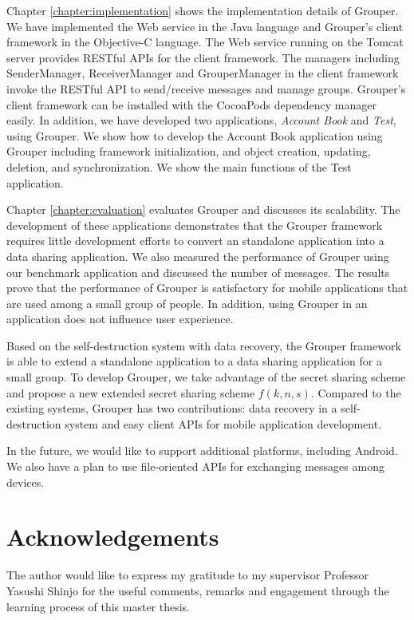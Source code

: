 \documentclass[a4paper,11pt]{report}
\begin{document}
Chapter \ref{chapter:implementation} shows the implementation details of Grouper.
We have implemented the Web service in the Java language and Grouper's client framework in the Objective-C language.
The Web service running on the Tomcat server provides RESTful APIs for the client framework. 
The managers including SenderManager, ReceiverManager and GrouperManager in the client framework invoke the RESTful API to send/receive messages and manage groups.
Grouper's client framework can be installed with the CocoaPods dependency manager easily.
In addition, we have developed two applications, \emph{Account Book} and \emph{Test}, using Grouper.
We show how to develop the Account Book application using Grouper including framework initialization, and object creation, updating, deletion, and synchronization.
We show the main functions of the Test application.

Chapter \ref{chapter:evaluation} evaluates Grouper and discusses its scalability.
The development of these applications demonstrates that the Grouper framework requires little development efforts to convert an standalone application into a data sharing application.
We also measured the performance of Grouper using our benchmark application and discussed the number of messages.
The results prove that the performance of Grouper is satisfactory for mobile applications that are used among a small group of people.
In addition, using Grouper in an application does not influence user experience.

Based on the self-destruction system with data recovery, the Grouper framework is able to extend a standalone application to a data sharing application for a small group.
To develop Grouper, we take advantage of the secret sharing scheme and propose a new extended secret sharing scheme $f(k, n, s)$.
Compared to the existing systems, Grouper has two contributions: data recovery in a self-destruction system and easy client APIs for mobile application development.

In the future, we would like to support additional platforms, including Android.
We also have a plan to use file-oriented APIs for exchanging messages among devices.

\chapter*{Acknowledgements}

The author would like to express my gratitude to my supervisor Professor Yasushi Shinjo for the useful comments, remarks and engagement through the learning process of this master thesis.
\end{document}
